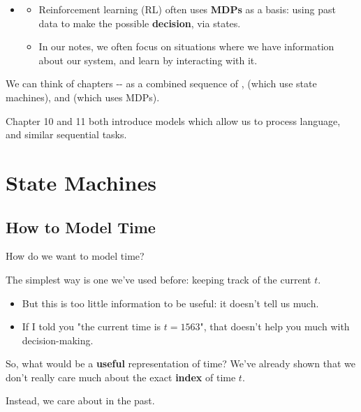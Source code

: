 \begin{itemize}
            \item {}
                \begin{itemize}
                    \item Reinforcement learning (RL) often uses \textbf{MDPs} as a basis: using past data to make the  possible \textbf{decision}, via states.
                    \item In our notes, we often focus on situations where we have  information about our system, and learn by interacting with it.
                \end{itemize}
        \end{itemize}

        We can think of chapters -- as a combined sequence of ,  (which use state machines), and  (which uses MDPs).

        Chapter 10 and 11 both introduce models which allow us to process language, and similar sequential tasks.

\pagebreak

\section{State Machines}

    \subsection{How to Model Time}

        How do we want to model time?

        The simplest way is one we've used before: keeping track of the current  $t$.

        \begin{itemize}
            \item But this is too little information to be useful: it doesn't tell us much.
            \item \miniex If I told you "the current time is $t=1563$", that doesn't help you much with decision-making.
        \end{itemize}

        So, what would be a \textbf{useful} representation of time? We've already shown that we don't really care much about the exact \textbf{index} of time $t$.

        Instead, we care about  in the past.\\

